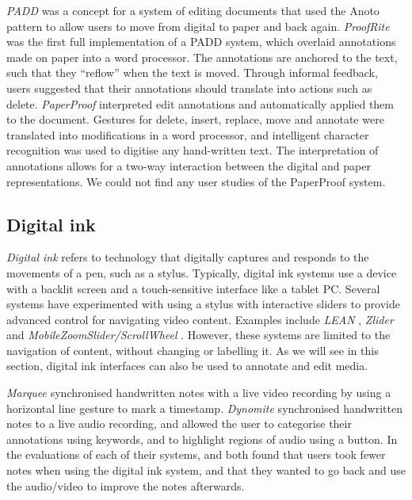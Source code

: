 \textit{PADD} \citep{Guimbretiere2003} was a concept for a system of editing documents that used the Anoto pattern to
allow users to move from digital to paper and back again.  \textit{ProofRite} \citep{Conroy2004} was the first full
implementation of a PADD system, which overlaid annotations made on paper into a word processor. The annotations are 
anchored to the text, such that they ``reflow'' when the text is moved.  Through informal feedback, users suggested
that their annotations should translate into actions such as delete.  \textit{PaperProof} \citep{Weibel2008}
interpreted edit annotations and automatically applied them to the document.  Gestures for delete, insert, replace,
move and annotate were translated into modifications in a word processor, and intelligent character recognition was
used to digitise any hand-written text. The interpretation of annotations allows for a two-way interaction between the
digital and paper representations. We could not find any user studies of the PaperProof system.




\subsection{Digital ink}
\textit{Digital ink} refers to technology that digitally captures and responds to the movements of a pen, such as a
stylus.  Typically, digital ink systems use a device with a backlit screen and a touch-sensitive interface like a
tablet PC.  Several systems have experimented with using a stylus with interactive sliders to provide advanced control
for navigating video content. Examples include \textit{LEAN} \citep{Ramos2003}, \textit{Zlider} \citep{Ramos2005} and
\textit{MobileZoomSlider/ScrollWheel} \citep{Huerst2008}. However, these systems are limited to the navigation of
content, without changing or labelling it.  As we will see in this section, digital ink interfaces can also be used to
annotate and edit media.

\textit{Marquee} \citep{Weher1994} synchronised handwritten notes with a live video recording by using a horizontal
line gesture to mark a timestamp.  \textit{Dynomite} \citep{Wilcox1997} synchronised handwritten notes to a live audio
recording, and allowed the user to categorise their annotations using keywords, and to highlight regions of audio using
a button.  In the evaluations of each of their systems, \citet{Weher1994} and \citet{Wilcox1997} both found that users
took fewer notes when using the digital ink system, and that they wanted to go back and use the audio/video to improve
the notes afterwards.



